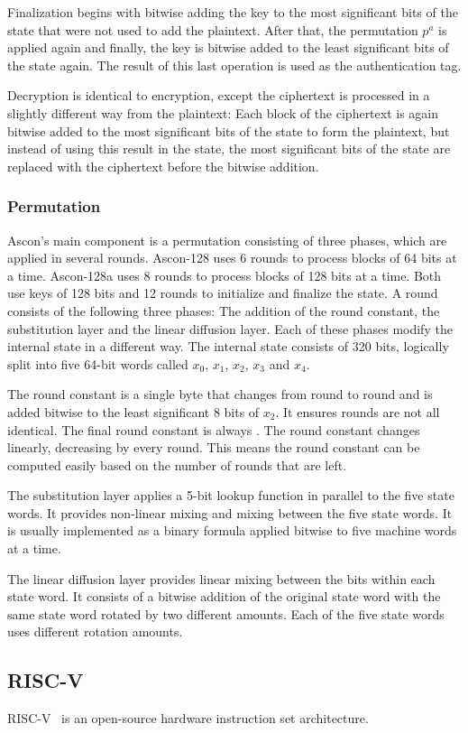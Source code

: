 Finalization begins with bitwise adding the key to the most significant bits of
the state that were not used to add the plaintext. After that, the permutation
$p^a$ is applied again and finally, the key is bitwise added to the least
significant bits of the state again. The result of this last operation is used
as the authentication tag.

Decryption is identical to encryption, except the ciphertext is processed in a
slightly different way from the plaintext: Each block of the ciphertext is again
bitwise added to the most significant bits of the state to form the plaintext,
but instead of using this result in the state, the most significant bits of the
state are replaced with the ciphertext before the bitwise addition.

\subsubsection{Permutation}

Ascon's main component is a permutation consisting of three phases, which are
applied in several rounds. Ascon-128 uses 6 rounds to process blocks of 64 bits
at a time. Ascon-128a uses 8 rounds to process blocks of 128 bits at a time.
Both use keys of 128 bits and 12 rounds to initialize and finalize the state. A
round consists of the following three phases: The addition of the round
constant, the substitution layer and the linear diffusion layer. Each of these
phases modify the internal state in a different way. The internal state consists
of 320 bits, logically split into five 64-bit words called $x_0$, $x_1$, $x_2$,
$x_3$ and $x_4$.

The round constant is a single byte that changes from round to round and is
added bitwise to the least significant 8 bits of $x_2$. It ensures rounds are
not all identical. The final round constant is always . The round
constant changes linearly, decreasing by  every round. This means
the round constant can be computed easily based on the number of rounds that are
left.

The substitution layer applies a 5-bit lookup function in parallel to the five
state words. It provides non-linear mixing and mixing between the five state
words. It is usually implemented as a binary formula applied bitwise to five
machine words at a time.

The linear diffusion layer provides linear mixing between the bits within each
state word. It consists of a bitwise addition of the original state word with
the same state word rotated by two different amounts. Each of the five state
words uses different rotation amounts.

\subsection{RISC-V}
RISC-V~\cite{riscv} is an open-source hardware instruction set architecture.

